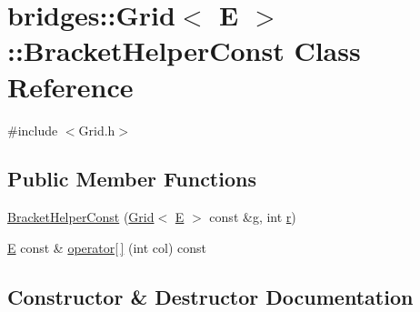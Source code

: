 \hypertarget{classbridges_1_1_grid_1_1_bracket_helper_const}{}\section{bridges\+:\+:Grid$<$ E $>$\+:\+:Bracket\+Helper\+Const Class Reference}
\label{classbridges_1_1_grid_1_1_bracket_helper_const}


{\ttfamily \#include $<$Grid.\+h$>$}

\subsection*{Public Member Functions}
\begin{DoxyCompactItemize}
\item 
\hyperlink{classbridges_1_1_grid_1_1_bracket_helper_const_a7ae889b338baf5f86f0fffcccbcc70ed}{Bracket\+Helper\+Const} (\hyperlink{classbridges_1_1_grid}{Grid}$<$ \hyperlink{namespacebridges_acfb0a4f7877d8f63de3e6862004c50eda3a3ea00cfc35332cedf6e5e9a32e94da}{E} $>$ const \&\hyperlink{namespacebridges_acfb0a4f7877d8f63de3e6862004c50edab2f5ff47436671b6e533d8dc3614845d}{g}, int \hyperlink{namespacebridges_acfb0a4f7877d8f63de3e6862004c50eda4b43b0aee35624cd95b910189b3dc231}{r})
\item 
\hyperlink{namespacebridges_acfb0a4f7877d8f63de3e6862004c50eda3a3ea00cfc35332cedf6e5e9a32e94da}{E} const  \& \hyperlink{classbridges_1_1_grid_1_1_bracket_helper_const_aef4accf6080a14a2146e13bd42dc9553}{operator\mbox{[}$\,$\mbox{]}} (int col) const
\end{DoxyCompactItemize}


\subsection{Constructor \& Destructor Documentation}
\mbox{\label{classbridges_1_1_grid_1_1_bracket_helper_const_a7ae889b338baf5f86f0fffcccbcc70ed}} 
